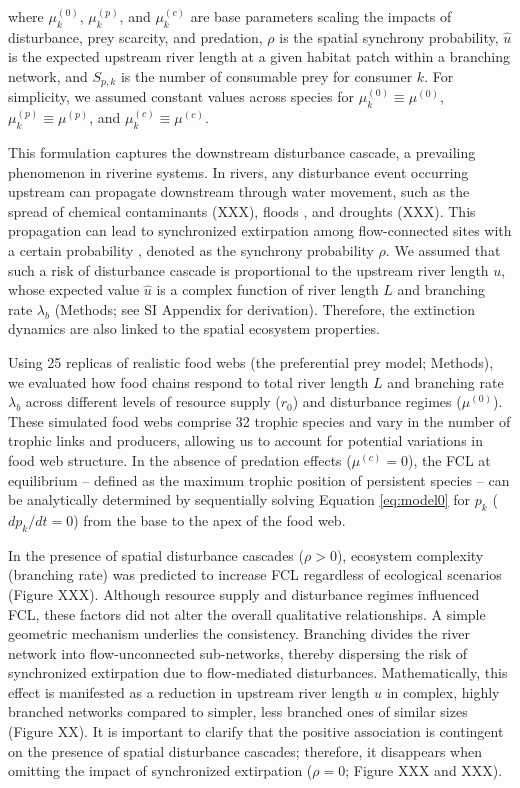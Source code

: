 \documentclass[11pt, class=article, crop=false]{standalone}
\begin{document}
where $\mu_k^{(0)}$, $\mu_k^{(p)}$, and $\mu_k^{(c)}$ are base parameters scaling the impacts of disturbance, prey scarcity, and predation, $\rho$ is the spatial synchrony probability, $\hat{u}$ is the expected upstream river length at a given habitat patch within a branching network, and $S_{p, k}$ is the number of consumable prey for consumer $k$.
For simplicity, we assumed constant values across species for $\mu_k^{(0)} \equiv \mu^{(0)}$, $\mu_k^{(p)} \equiv \mu^{(p)}$, and $\mu_k^{(c)} \equiv \mu^{(c)}$.

This formulation captures the downstream disturbance cascade, a prevailing phenomenon in riverine systems.
In rivers, any disturbance event occurring upstream can propagate downstream through water movement, such as the spread of chemical contaminants (XXX), floods \citep{swanson_flood_1998, nakamura_disturbance_2000}, and droughts (XXX).
This propagation can lead to synchronized extirpation among flow-connected sites with a certain probability \citep{larsen_geography_2021, sarremejane_drought_2021}, denoted as the synchrony probability $\rho$. 
We assumed that such a risk of disturbance cascade is proportional to the upstream river length $u$, whose expected value $\hat{u}$ is a complex function of river length $L$ and branching rate $\lambda_b$ (Methods; see SI Appendix for derivation).
Therefore, the extinction dynamics are also linked to the spatial ecosystem properties.

Using 25 replicas of realistic food webs (the preferential prey model; Methods), we evaluated how food chains respond to total river length $L$ and branching rate $\lambda_b$ across different levels of resource supply ($r_0$) and disturbance regimes ($\mu^{(0)}$).
These simulated food webs comprise 32 trophic species and vary in the number of trophic links and producers, allowing us to account for potential variations in food web structure.
In the absence of predation effects ($\mu^{(c)} = 0$), the FCL at equilibrium -- defined as the maximum trophic position of persistent species -- can be analytically determined by sequentially solving Equation \ref{eq:model0} for $p_k$ ($dp_k/dt = 0$) from the base to the apex of the food web. 

In the presence of spatial disturbance cascades ($\rho > 0$), ecosystem complexity (branching rate) was predicted to increase FCL regardless of ecological scenarios (Figure XXX).
Although resource supply and disturbance regimes influenced FCL, these factors did not alter the overall qualitative relationships.
A simple geometric mechanism underlies the consistency.
Branching divides the river network into flow-unconnected sub-networks, thereby dispersing the risk of synchronized extirpation due to flow-mediated disturbances.
Mathematically, this effect is manifested as a reduction in upstream river length $\hat{u}$ in complex, highly branched networks compared to simpler, less branched ones of similar sizes (Figure XX).
It is important to clarify that the positive association is contingent on the presence of spatial disturbance cascades; therefore, it disappears when omitting the impact of synchronized extirpation ($\rho = 0$; Figure XXX and XXX).
\end{document}
